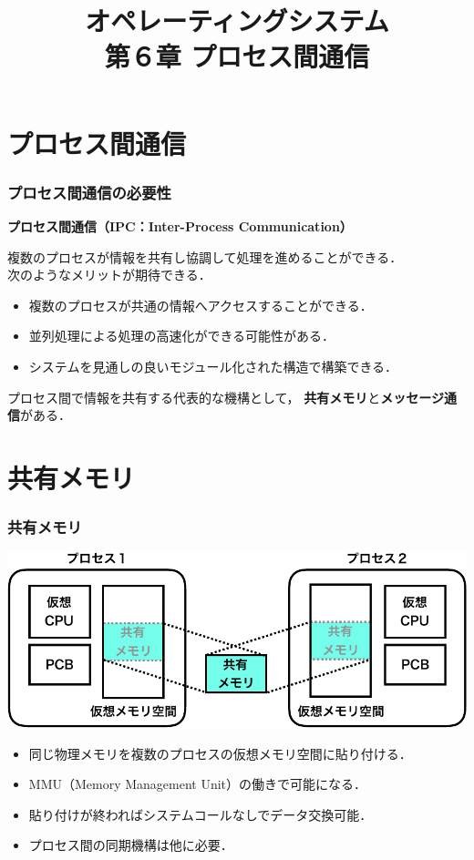 \documentclass{beamer}                   %
\begin{document}
\title[OS]{オペレーティングシステム\\第６章 プロセス間通信}
\date{}

\begin{frame}
  \titlepage
\end{frame}


\section{プロセス間通信}
\begin{frame}
  \frametitle{プロセス間通信の必要性}

{\bf プロセス間通信（IPC：Inter-Process Communication）}

複数のプロセスが情報を共有し協調して処理を進めることができる．\\
次のようなメリットが期待できる．

\begin{itemize}
\item 複数のプロセスが共通の情報へアクセスすることができる．
\item 並列処理による処理の高速化ができる可能性がある．
\item システムを見通しの良いモジュール化された構造で構築できる．
\end{itemize}

プロセス間で情報を共有する代表的な機構として，
{\bf 共有メモリ}と{\bf メッセージ通信}がある．
\end{frame}

\section{共有メモリ}
\begin{frame}
  \frametitle{共有メモリ}
  \begin{center}
    \includegraphics[scale=0.6]{Fig/ipcShearedMemory-crop.pdf}
  \end{center}
  \begin{itemize}
  \item 同じ物理メモリを複数のプロセスの仮想メモリ空間に貼り付ける．
  \item MMU（Memory Management Unit）の働きで可能になる．
  \item 貼り付けが終わればシステムコールなしでデータ交換可能．
  \item プロセス間の同期機構は他に必要．
  \end{itemize}
\end{frame}
\end{document}
